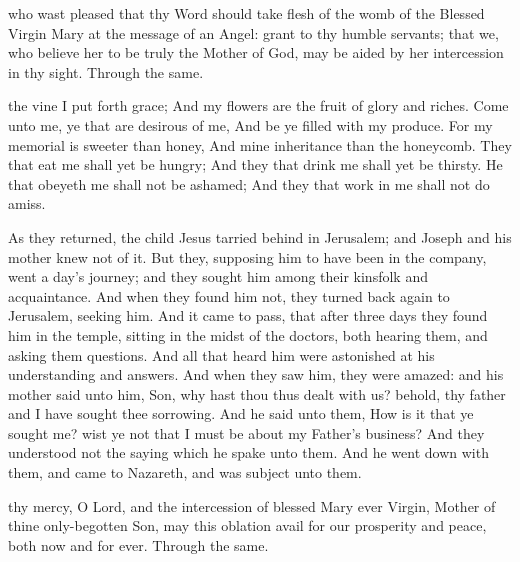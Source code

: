 \collect
{} who wast pleased that thy Word should take flesh of the womb of the Blessed Virgin Mary at the message of an Angel: grant to thy humble servants; that we, who believe her to be truly the Mother of God, may be aided by her intercession in thy sight. Through the same.

 the vine I put forth grace; And my flowers are the fruit of glory and riches. Come unto me, ye that are desirous of me, And be ye filled with my produce. For my memorial is sweeter than honey, And mine inheritance than the honeycomb. They that eat me shall yet be hungry; And they that drink me shall yet be thirsty. He that obeyeth me shall not be ashamed; And they that work in me shall not do amiss. 


 As they returned, the child Jesus tarried behind in Jerusalem; and Joseph and his mother knew not of it. But they, supposing him to have been in the company, went a day's journey; and they sought him among their kinsfolk and acquaintance. And when they found him not, they turned back again to Jerusalem, seeking him. And it came to pass, that after three days they found him in the temple, sitting in the midst of the doctors, both hearing them, and asking them questions. And all that heard him were astonished at his understanding and answers. And when they saw him, they were amazed: and his mother said unto him, Son, why hast thou thus dealt with us? behold, thy father and I have sought thee sorrowing. And he said unto them, How is it that ye sought me? wist ye not that I must be about my Father's business? And they understood not the saying which he spake unto them. And he went down with them, and came to Nazareth, and was subject unto them.


\secret
{} thy mercy, O Lord, and the intercession of blessed Mary ever Virgin, Mother of thine only-begotten Son, may this oblation avail for our prosperity and peace, both now and for ever. Through the same.

